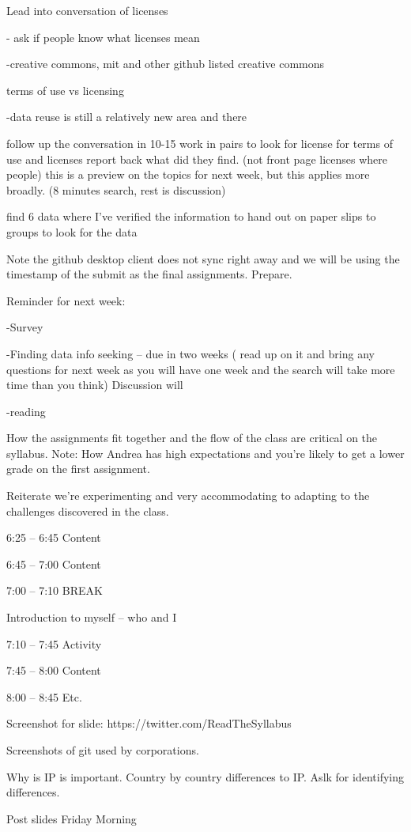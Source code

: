 \documentclass[]{article}
\begin{document}
Lead into conversation of licenses

- ask if people know what licenses mean

-creative commons, mit and other github listed creative commons

terms of use vs licensing

-data reuse is still a relatively new area and there

follow up the conversation in 10-15 work in pairs to look for license
for terms of use and licenses report back what did they find. (not front
page licenses where people) this is a preview on the topics for next
week, but this applies more broadly. (8 minutes search, rest is
discussion)

find 6 data where I've verified the information to hand out on paper
slips to groups to look for the data

Note the github desktop client does not sync right away and we will be
using the timestamp of the submit as the final assignments. Prepare.

Reminder for next week:

-Survey

-Finding data info seeking -- due in two weeks ( read up on it and bring
any questions for next week as you will have one week and the search
will take more time than you think) Discussion will

-reading

How the assignments fit together and the flow of the class are critical
on the syllabus. Note: How Andrea has high expectations and you're
likely to get a lower grade on the first assignment.

Reiterate we're experimenting and very accommodating to adapting to the
challenges discovered in the class.

6:25 -- 6:45 Content

6:45 -- 7:00 Content

7:00 -- 7:10 BREAK

Introduction to myself -- who and I

7:10 -- 7:45 Activity

7:45 -- 8:00 Content

8:00 -- 8:45 Etc.

Screenshot for slide: https://twitter.com/ReadTheSyllabus

Screenshots of git used by corporations.

Why is IP is important. Country by country differences to IP. Aslk for
identifying differences.

Post slides Friday Morning
\end{document}
